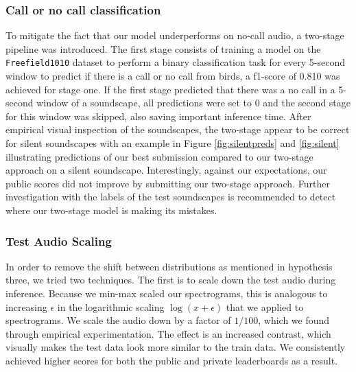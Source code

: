 \subsubsection{Call or no call classification}
To mitigate the fact that our model underperforms on no-call audio, a two-stage pipeline was introduced. The first stage consists of training a model on the \texttt{Freefield1010} \cite{freefield} dataset to perform a binary classification task for every 5-second window to predict if there is a call or no call from birds, a f1-score of 0.810 was achieved for stage one.  If the first stage predicted that there was a no call in a 5-second window of a soundscape, all predictions were set to 0 and the second stage for this window was skipped, also saving important inference time. After empirical visual inspection of the soundscapes, the two-stage appear to be correct for silent soundscapes with an example in Figure \ref{fig:silentpreds} and \ref{fig:silent} illustrating predictions of our best submission compared to our two-stage approach on a silent soundscape. Interestingly, against our expectations, our public scores did not improve by submitting our two-stage approach. Further investigation with the labels of the test soundscapes is recommended to detect where our two-stage model is making its mistakes. 

\subsubsection{Test Audio Scaling}
In order to remove the shift between distributions as mentioned in hypothesis three, we tried two techniques. The first is to scale down the test audio during inference. Because we min-max scaled our spectrograms, this is analogous to increasing $\epsilon$ in the logarithmic scaling $\log({x + \epsilon})$ that we applied to spectrograms. We scale the audio down by a factor of $1/100$, which we found through empirical experimentation. The effect is an increased contrast, which visually makes the test data look more similar to the train data. We consistently achieved higher scores for both the public and private leaderboards as a result. 

